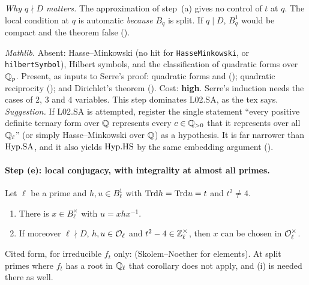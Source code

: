 \noindent\emph{Why $q\nmid D$ matters.} The approximation of step~(a) gives no control of $t$ at $q$. The local condition at $q$
is automatic \emph{because} $B_q$ is split. If $q\mid D$, $B^1_q$ would be compact and the theorem false
().

\begin{sloppypar}\noindent\emph{Mathlib.} Absent: Hasse--Minkowski (no hit for \texttt{HasseMinkowski},  or
\texttt{hilbertSymbol}), Hilbert symbols, and the classification of quadratic forms over $\mathbb{Q}_p$. Present, as inputs to Serre's
proof: quadratic forms and  (); quadratic
reciprocity  (); and
Dirichlet's theorem  (). Cost:
\textbf{high}. Serre's induction needs the cases of $2$, $3$ and $4$ variables. This step dominates L02.SA, as the tex says.
\emph{Suggestion.} If L02.SA is attempted, register the single statement ``every positive definite ternary form over $\mathbb{Q}$
represents every $c\in\mathbb{Q}_{>0}$ that it represents over all $\mathbb{Q}_\ell$'' (or simply Hasse--Minkowski over $\mathbb{Q}$) as a hypothesis.
It is far narrower than $\mathrm{Hyp.SA}$, and it also yields $\mathrm{Hyp.HS}$ by the same embedding argument
(). \stexp{}\end{sloppypar}

\paragraph{Step (e): local conjugacy, with integrality at almost all primes.}

\begin{lemma}\label{lem:s02-sa-step-e}
Let $\ell$ be a prime and $h,u\in B^1_\ell$ with $\mathrm{Trd} h=\mathrm{Trd} u=t$ and $t^2\ne4$.
\begin{enumerate}[label=(\roman*)]
\item There is $x\in B_\ell^\times$ with $u=xhx^{-1}$.
\item If moreover $\ell\nmid D$, $h,u\in\mathcal{O}_\ell$ and $t^2-4\in\mathbb{Z}_\ell^\times$, then $x$ can be chosen in $\mathcal{O}_\ell^\times$.
\end{enumerate}
\stproved{} Cited form, for irreducible $f_t$ only: 
(Skolem--Noether for elements). At split primes where $f_t$ has a root in $\mathbb{Q}_\ell$ that corollary does not apply, and (i) is
needed there as well.
\end{lemma}

